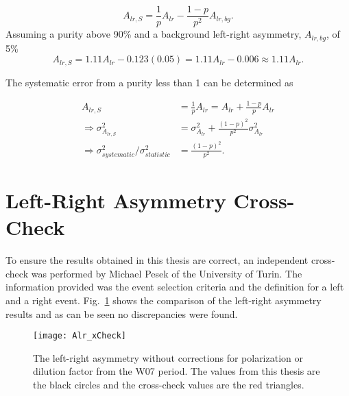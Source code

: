 \begin{equation}
  A_{lr,S} = \frac{1}{p} A_{lr} - \frac{1-p}{p^2} A_{lr,bg}.
\end{equation}
\noindent
Assuming a purity above 90\% and a background left-right asymmetry, $A_{lr,bg}$,
of 5\%
\begin{equation}
  A_{lr,S} = 1.11 A_{lr} - 0.123(0.05) = 1.11 A_{lr} - 0.006\approx 1.11 A_{lr}.
\end{equation}

The systematic error from a purity less than 1 can be determined as

\begin{align}
  A_{lr,S} &= \frac{1}{p}A_{lr} = A_{lr} + \frac{1-p}{p}A_{lr}
  \\ \nonumber
  \Rightarrow \sigma^2_{A_{lr,S}} &= \sigma^2_{A_{lr}} + \frac{(1-p)^2}{p^2} \sigma^2_{A_{lr}}
  \\ \nonumber
  \Rightarrow \sigma^2_{systematic}/\sigma^2_{statistic} &= \frac{(1-p)^2}{p^2}.
\end{align}


\section{Left-Right Asymmetry Cross-Check} \label{app::xcheckAlr}

To ensure the results obtained in this thesis are correct, an independent
cross-check was performed by Michael Pesek of the University of Turin.  The
information provided was the event selection criteria and the definition for a
left and a right event.  Fig.~\ref{fig::Alr_xCheck} shows the comparison of the
left-right asymmetry results and as can be seen no discrepancies were found.

\begin{figure}[h!t]
  \centering
  \texttt{[image: Alr\_xCheck]}
  \caption{The left-right asymmetry without corrections for polarization or
    dilution factor from the W07 period.  The values from this thesis are the
    black circles and the cross-check values are the red triangles.}
  \label{fig::Alr_xCheck}
\end{figure}

